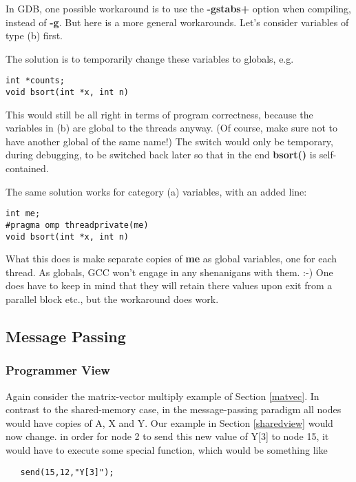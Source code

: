 In GDB, one possible workaround is to use the {\bf -gstabs+} option when
compiling, instead of {\bf -g}.  But here is a more general workarounds.
Let's consider variables of type (b) first.

The solution is to temporarily change these variables to globals, e.g.

\begin{lstlisting}
int *counts;
void bsort(int *x, int n)
\end{lstlisting}

This would still be all right in terms of program correctness, because
the variables in (b) are global to the threads anyway. (Of course, make
sure not to have another global of the same name!) The switch would only
be temporary, during debugging, to be switched back later so that in the
end {\bf bsort()} is self-contained.

The same solution works for category (a) variables, with an added line:

\begin{lstlisting}
int me;
#pragma omp threadprivate(me)
void bsort(int *x, int n)
\end{lstlisting}

What this does is make separate copies of {\bf me} as global variables, one
for each thread. As globals, GCC won't engage in any shenanigans with
them. :-) One does have to keep in mind that they will retain there
values upon exit from a parallel block etc., but the workaround does
work.



\subsection{Message Passing}

\subsubsection{Programmer View}
\label{msgview}

Again consider the matrix-vector multiply example of Section
\ref{matvec}.  In contrast to the shared-memory case, in the
message-passing paradigm all nodes would have  copies
of A, X and Y.  Our example in Section \ref{sharedview} would now
change.  in order for node 2 to send this new value of Y{[}3{]} to node
15, it would have to execute some special function, which would be
something like

\begin{Verbatim}
   send(15,12,"Y[3]");
\end{Verbatim}

